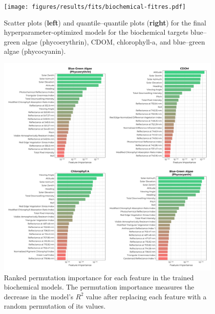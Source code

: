 \documentclass[remotesensing,article,accept,pdftex,moreauthors]{Definitions/mdpi}
\begin{document}
\begin{figure}[H]

\vspace{-0.15in}
\hspace{-6pt}\texttt{[image: figures/results/fits/biochemical-fitres.pdf]}
\vspace{-0.1in}
\caption{Scatter plots (\textbf{left}) and quantile--quantile plots (\textbf{right}) for the final hyperparameter-optimized models for the biochemical targets blue--green algae (phycoerythrin), CDOM, chlorophyll-a, and blue--green algae (phycocyanin). \label{fig:biochem-fit}}
\end{figure}  

\begin{figure}[H]

\vspace{-0.15in}
\hspace{-6pt}\includegraphics[width=0.9\columnwidth]{figures/results/fits/biochemical-ranking.pdf}
\vspace{-0.1in}
\caption{Ranked permutation importance for each feature in the trained biochemical models. The permutation importance measures the decrease in the model's $R^2$ value after replacing each feature with a random permutation of its values.\label{fig:biochem-fi}}
\end{figure}  
\end{document}
